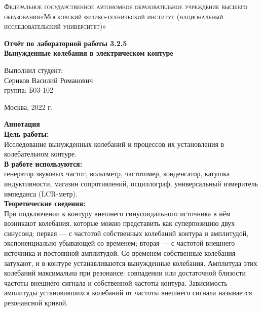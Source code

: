 \documentclass[a4paper, 12pt]{article}%
\begin{document}
	\begin{titlepage}
		\begin{center}
			\textsc{Федеральное государственное автономное образовательное учреждение высшего образования«Московский физико-технический институт (национальный исследовательский университет)»\\[5mm]
			}
			
			\vfill
			
			\textbf{Отчёт по лабораторной работы 3.2.5\\[3mm]
				Вынужденные колебания в электрическом контуре
				\\[50mm]
			}
			
		\end{center}
		
		\hfill
		\begin{minipage}{.5\textwidth}
			Выполнил студент:\\[2mm]
			Сериков Василий Романович\\[2mm]
			группа: Б03-102\\[5mm]
			
		\end{minipage}
		\vfill
		\begin{center}
			Москва, 2022 г.
		\end{center}
		
	\end{titlepage}
	
	\newpage
	\textbf{Аннотация}\\
	
	
	\textbf{Цель работы: }\\
	
	Исследование вынужденных колебаний и процессов их установления в колебательном контуре.\\
	
	\textbf{В работе используются: }\\
	
	генератор звуковых частот, вольтметр, частотомер, конденсатор, катушка индуктивности, магазин сопротивлений, осциллограф, универсальный измеритель импеданса (LCR-метр).\\
	
	\textbf{Теоретические сведения: } \\
	
	При подключении к контуру внешнего синусоидального источника в
	нём возникают колебания, которые можно представить как суперпозицию двух синусоид: первая — с частотой собственных колебаний
	контура и амплитудой, экспоненциально убывающей со временем; вторая — с частотой внешнего источника и постоянной амплитудой. Со временем собственные колебания затухают, и в контуре устанавливаются
	вынужденные колебания. Амплитуда этих колебаний максимальна при
	резонансе: совпадении или достаточной близости частоты внешнего сигнала и собственной частоты контура. Зависимость амплитуды установившихся колебаний от частоты внешнего сигнала называется резонансной
	кривой.
	
\end{document}
